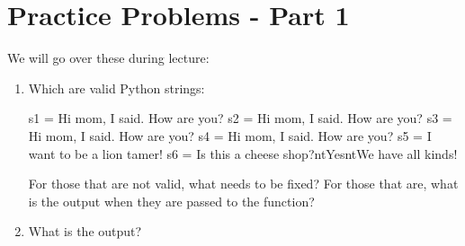 \documentclass[letterpaper,10pt,english]{sphinxmanual}
\begin{document}
\section{Practice Problems - Part 1}
\label{\detokenize{lecture_notes/lec03_strings:practice-problems-part-1}}
We will go over these during lecture:
\begin{enumerate}
\item {} 
Which are valid Python strings:

%
\begin{sphinxVerbatim}[commandchars=\\\{\}]
\PYGZgt{}\PYGZgt{}\PYGZgt{} s1 = \PYGZsq{}\PYGZdq{}Hi mom\PYGZdq{}, I said.  \PYGZdq{}How are you?\PYGZdq{}\PYGZsq{}
\PYGZgt{}\PYGZgt{}\PYGZgt{} s2 = \PYGZsq{}\PYGZdq{}Hi mom\PYGZdq{}, I said.  \PYGZsq{}\PYGZdq{}How are you?\PYGZdq{}
\PYGZgt{}\PYGZgt{}\PYGZgt{} s3 = \PYGZsq{}\PYGZdq{}Hi mom\PYGZdq{}, I said.  \PYGZsq{}\PYGZdq{}How are you?\PYGZdq{}\PYGZsq{}
\PYGZgt{}\PYGZgt{}\PYGZgt{} s4 = \PYGZdq{}\PYGZdq{}\PYGZdq{}\PYGZsq{}Hi mom\PYGZdq{}, I said.  \PYGZsq{}\PYGZdq{}How are you?\PYGZdq{}\PYGZsq{}\PYGZdq{}\PYGZdq{}\PYGZdq{}
\PYGZgt{}\PYGZgt{}\PYGZgt{} s5 = \PYGZdq{}\PYGZdq{}I want to be a lion tamer!\PYGZdq{}\PYGZsq{}
\PYGZgt{}\PYGZgt{}\PYGZgt{} s6 = \PYGZdq{}\PYGZbs{}\PYGZdq{}Is this a cheese shop?\PYGZbs{}\PYGZdq{}\PYGZbs{}n\PYGZbs{}t\PYGZsq{}Yes\PYGZsq{}\PYGZbs{}n\PYGZbs{}t\PYGZbs{}\PYGZdq{}We have all kinds!\PYGZbs{}\PYGZdq{}\PYGZdq{}
\end{sphinxVerbatim}

For those that are not valid, what needs to be fixed?  For those
that are, what is the output when they are passed to the 
function?

\item {} 
What is the output?

%
\begin{sphinxVerbatim}[commandchars=\\\{\}]
  
\end{sphinxVerbatim}


\end{enumerate}
\end{document}
